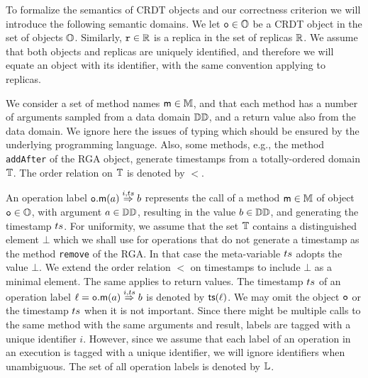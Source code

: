 To formalize the semantics of CRDT objects and our correctness
criterion we will introduce the following semantic domains.
%
We let $\mathtt{o} \in \mathbb{O}$ be a CRDT object in the set of objects
$\mathbb{O}$.
Similarly, $\mathtt{r} \in \mathbb{R}$ is a replica in the set of replicas
$\mathbb{R}$.
We assume that both objects and replicas are uniquely identified, and
therefore we will equate an object with its identifier, with the same
convention applying to replicas.

We consider a set of method names $\mathsf{m} \in \mathbb{M}$, and that each method has a
number of arguments sampled from a data domain $\mathbb{DD}$, and a
return value also from the data domain.
We ignore here the issues of typing which should be ensured by the
underlying programming language.
Also, some methods, e.g., the method {\tt addAfter} of the RGA object, generate timestamps from a
totally-ordered domain $\mathbb{T}$. The order relation on $\mathbb{T}$ is denoted by $<$.

An operation label ${{\mathtt{o}.\mathsf{m}}}(a) \overset{i,ts}{\Rightarrow} b$ represents the
call of a method $\mathsf{m} \in \mathbb{M}$ of object $\mathtt{o}\in \mathbb{O}$,
with argument $a \in \mathbb{DD}$, resulting in the value $b
\in \mathbb{DD}$, and generating the timestamp $ts$.
For uniformity, we assume that the set $\mathbb{T}$ contains a
distinguished element $\bot$ which we shall use for operations that do
not generate a timestamp as the method {\tt remove} of the RGA.
In that case the meta-variable $ts$ adopts the value $\bot$. We extend the order
relation $<$ on timestamps to include $\bot$ as a minimal element.
The same applies to return values.
The timestamp $ts$ of an operation label $\ell={{\mathtt{o}.\mathsf{m}}}(a) \overset{i,ts}{\Rightarrow} b$
is denoted by $\mathsf{ts}(\ell)$.
We may omit the object $\mathtt{o}$ or the timestamp $ts$ when it is not important.
Since there might be multiple calls to the same method with the same
arguments and result, labels are tagged with a unique identifier $i$.
However, since we assume that each label of an operation in an
execution is tagged with a unique identifier, we will ignore
identifiers when unambiguous.
The set of all operation labels is denoted by $\mathbb{L}$.

